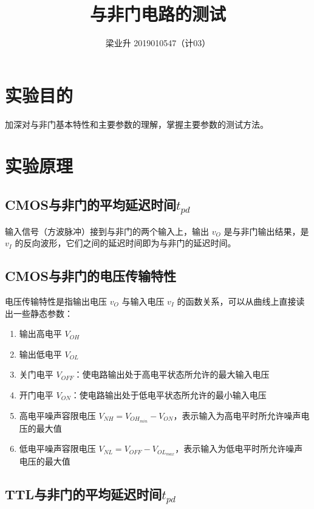 \documentclass[a4paper]{article}
\begin{document}
\title{与非门电路的测试}
\author{梁业升 2019010547（计03）}

\maketitle

\section{实验目的}

加深对与非门基本特性和主要参数的理解，掌握主要参数的测试方法。

\section{实验原理}

\subsection{CMOS与非门的平均延迟时间$t_{{pd}}$}

输入信号（方波脉冲）接到与非门的两个输入上，输出 $v_O$ 是与非门输出结果，是 $v_{I}$ 的反向波形，它们之间的延迟时间即为与非门的延迟时间。

\subsection{CMOS与非门的电压传输特性}

电压传输特性是指输出电压 $v_{O}$ 与输入电压 $v_{I}$ 的函数关系，可以从曲线上直接读出一些静态参数：

\begin{enumerate}
    \item 输出高电平 $V_{OH}$
    \item 输出低电平 $V_{OL}$
    \item 关门电平 $V_{OFF}$：使电路输出处于高电平状态所允许的最大输入电压
    \item 开门电平 $V_{ON}$：使电路输出处于低电平状态所允许的最小输入电压
    \item 高电平噪声容限电压 $V_{NH}=V_{OH_{min}}-V_{ON}$，表示输入为高电平时所允许噪声电压的最大值
    \item 低电平噪声容限电压 $V_{NL}=V_{OFF}-V_{OL_{max}}$，表示输入为低电平时所允许噪声电压的最大值
\end{enumerate}

\subsection{TTL与非门的平均延迟时间$t_{pd}$}
\end{document}

